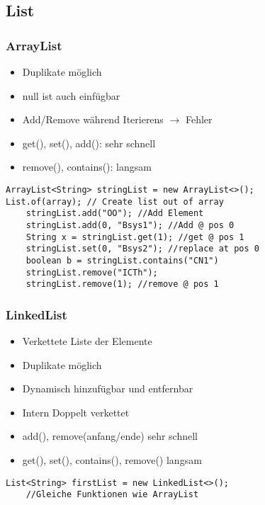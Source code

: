 \begin{multicols*}{5}
\begin{lstlisting}
		\end{lstlisting}
	
	\subsection{List}
		\subsubsection{ArrayList}
			\begin{itemize}
				\item Duplikate möglich
				\item null ist auch einfügbar
				\item Add/Remove während Iterierens $\rightarrow$ Fehler
				\item get(), set(), add(): sehr schnell
				\item remove(), contains(): langsam
			\end{itemize}
			\begin{lstlisting}
ArrayList<String> stringList = new ArrayList<>();
List.of(array); // Create list out of array
	stringList.add("OO"); //Add Element
	stringList.add(0, "Bsys1"); //Add @ pos 0
	String x = stringList.get(1); //get @ pos 1
	stringList.set(0, "Bsys2"); //replace at pos 0
	boolean b = stringList.contains("CN1")
	stringList.remove("ICTh");
	stringList.remove(1); //remove @ pos 1
			\end{lstlisting}

		\subsubsection{LinkedList}
		\begin{itemize}
			\item Verkettete Liste der Elemente
			\item Duplikate möglich
			\item Dynamisch hinzufügbar und entfernbar
			\item Intern Doppelt verkettet
			\item add(), remove(anfang/ende) sehr schnell
			\item get(), set(), contains(), remove() langsam
		\end{itemize}
		\begin{lstlisting}
List<String> firstList = new LinkedList<>();
	//Gleiche Funktionen wie ArrayList
		\end{lstlisting}
	
	

\end{multicols*}
